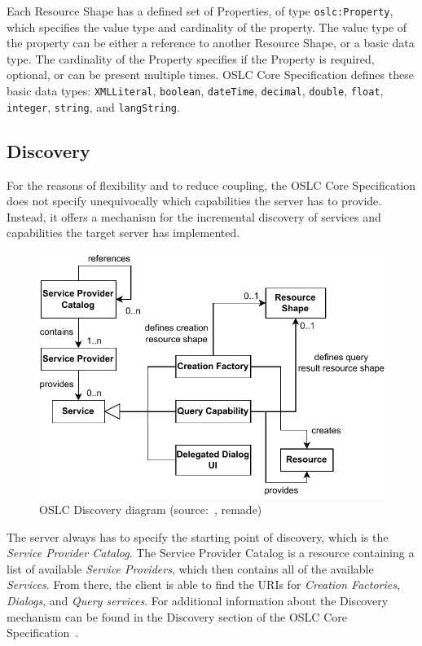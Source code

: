 Each Resource Shape has a defined set of Properties, of type \texttt{oslc:Property}, which specifies the value type and cardinality of the property. The value type of the property can be either a reference to another Resource Shape, or a basic data type. The cardinality of the Property specifies if the Property is required, optional, or can be present multiple times. OSLC Core Specification defines these basic data types: \texttt{XMLLiteral}, \texttt{boolean}, \texttt{dateTime}, \texttt{decimal}, \texttt{double}, \texttt{float}, \texttt{integer}, \texttt{string}, and \texttt{langString}.

\subsection*{Discovery}
\label{sec:oslc_discovery}
For the reasons of flexibility and to reduce coupling, the OSLC Core Specification does not specify unequivocally which capabilities the server has to provide. Instead, it offers a mechanism for the incremental discovery of services and capabilities the target server has implemented.

\begin{figure}[hbt]
  \centering
  \includegraphics[width=.8 \linewidth]{figures/oslc-discovery.pdf}
  \caption{OSLC Discovery diagram (source: \cite{oslc_core_discovery}, remade)}
  \label{fig:oslc_discovery}
\end{figure}

The server always has to specify the starting point of discovery, which is the \emph{Service Provider Catalog}. The Service Provider Catalog is a resource containing a list of available \emph{Service Providers}, which then contains all of the available \emph{Services}. From there, the client is able to find the URIs for \emph{Creation Factories}, \emph{Dialogs}, and \emph{Query services}. For additional information about the Discovery mechanism can be found in the Discovery section of the OSLC Core Specification \cite{oslc_core_discovery}.


